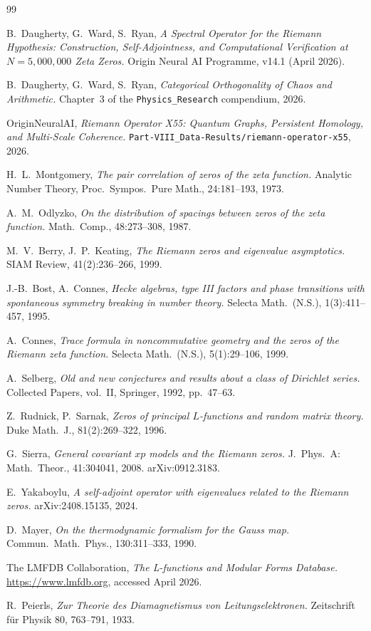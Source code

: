 \documentclass[11pt,a4paper]{article}
\begin{document}
\begin{thebibliography}{99}

B.~Daugherty, G.~Ward, S.~Ryan,
\emph{A Spectral Operator for the Riemann Hypothesis: Construction,
Self-Adjointness, and Computational Verification at
$N=5{,}000{,}000$ Zeta Zeros.}
Origin Neural AI Programme, v14.1 (April 2026).

B.~Daugherty, G.~Ward, S.~Ryan,
\emph{Categorical Orthogonality of Chaos and Arithmetic.}
Chapter~3 of the \texttt{Physics\_Research} compendium, 2026.

OriginNeuralAI,
\emph{Riemann Operator X55: Quantum Graphs, Persistent Homology,
and Multi-Scale Coherence.}
\texttt{Part-VIII\_Data-Results/riemann-operator-x55}, 2026.

H.~L.~Montgomery,
\emph{The pair correlation of zeros of the zeta function.}
Analytic Number Theory, Proc.~Sympos.~Pure Math., 24:181--193, 1973.

A.~M.~Odlyzko,
\emph{On the distribution of spacings between zeros of the zeta function.}
Math.~Comp., 48:273--308, 1987.

M.~V.~Berry, J.~P.~Keating,
\emph{The Riemann zeros and eigenvalue asymptotics.}
SIAM Review, 41(2):236--266, 1999.

J.-B.~Bost, A.~Connes,
\emph{Hecke algebras, type III factors and phase transitions with
spontaneous symmetry breaking in number theory.}
Selecta Math.~(N.S.), 1(3):411--457, 1995.

A.~Connes,
\emph{Trace formula in noncommutative geometry and the zeros of the
Riemann zeta function.}
Selecta Math.~(N.S.), 5(1):29--106, 1999.

A.~Selberg,
\emph{Old and new conjectures and results about a class of Dirichlet
series.}
Collected Papers, vol.~II, Springer, 1992, pp.~47--63.

Z.~Rudnick, P.~Sarnak,
\emph{Zeros of principal $L$-functions and random matrix theory.}
Duke Math.~J., 81(2):269--322, 1996.

G.~Sierra,
\emph{General covariant $xp$ models and the Riemann zeros.}
J.~Phys.~A: Math.~Theor., 41:304041, 2008. arXiv:0912.3183.

E.~Yakaboylu,
\emph{A self-adjoint operator with eigenvalues related to the Riemann zeros.}
arXiv:2408.15135, 2024.

D.~Mayer,
\emph{On the thermodynamic formalism for the Gauss map.}
Commun.~Math.~Phys., 130:311--333, 1990.

The LMFDB Collaboration,
\emph{The L-functions and Modular Forms Database.}
\url{https://www.lmfdb.org}, accessed April 2026.

R.~Peierls,
\emph{Zur Theorie des Diamagnetismus von Leitungselektronen.}
Zeitschrift f\"ur Physik 80, 763--791, 1933.

\end{thebibliography}
\end{document}
